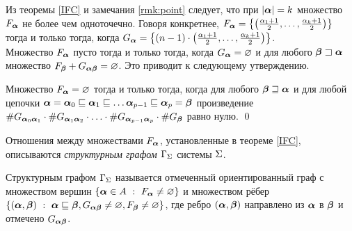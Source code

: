 %
%
%
%
%

Из теоремы \ref{IFC} и замечания \ref{rmk:point} следует, что при $|{\bm{\alpha}}|=k$ множество $F_{\bm{\alpha}}$ не более чем одноточечно.
Говоря конкретнее, $F_{\bm{\alpha}}=\left\{\left(\frac{\alpha_1+1}{2},\ldots, \frac{\alpha_k+1}{2}\right)\right\}$ тогда и только тогда, когда $G_{\bm{\alpha}}=\left\{(n-1)\cdot\left(\frac{\alpha_1+1}{2},\ldots, \frac{\alpha_k+1}{2}\right)\right\}$.\\

Множество $F_{\bm{\alpha}}$ пусто тогда и только тогда, когда $G_{\bm{\alpha}}=\varnothing$ и для любого ${\bm{\beta}}\sqsupset{\bm{\alpha}}$ множество $F_{\bm{\beta}}+G_{{\bm{\alpha}}{\bm{\beta}}}=\varnothing$.
Это приводит к следующему утверждению.

\begin{lemma}
Множество $F_{\bm{\alpha}}=\varnothing$ тогда и только тогда, когда для любого ${\bm{\beta}}\sqsupseteq{\bm{\alpha}}$ и для любой цепочки ${\bm{\alpha}}={\bm{\alpha}}_0\sqsubseteq{\bm{\alpha}}_1\sqsubseteq\ldots {\bm{\alpha}}_{p-1}\sqsubseteq{\bm{\alpha}}_p={\bm{\beta}}$ произведение 
$\#G_{{\bm{\alpha}}_0{\bm{\alpha}}_1}\cdot\#G_{{\bm{\alpha}}_1{\bm{\alpha}}_2}\cdot\ldots\cdot\#G_{{\bm{\alpha}}_{p-1}{\bm{\alpha}}_p}\cdot\#G_{{\bm{\beta}}}$ равно нулю. 
\qed
\end{lemma} 

Отношения между множествами $F_{\bm{\alpha}}$, установленные в теореме \ref{IFC}, описываются {\em структурным графом $\Gamma_\Sigma$} системы $\Sigma$. 

\begin{definition}
Структурным графом $\Gamma_\Sigma$ называется отмеченный ориентированный граф с множеством вершин $\{{\bm{\alpha}}\in A\ :\ F_{\bm{\alpha}}\neq\varnothing\}$ и множеством рёбер $\{({\bm{\alpha}}, {\bm{\beta}})\ :\ {\bm{\alpha}}\sqsubseteq{\bm{\beta}}, G_{{\bm{\alpha}}{\bm{\beta}}}\neq\varnothing, F_{\bm{\beta}}\neq\varnothing\}$, где ребро $({\bm{\alpha}}, {\bm{\beta}})$ направлено из ${\bm{\alpha}}$ в ${\bm{\beta}}$ и отмечено $G_{{\bm{\alpha}}{\bm{\beta}}}$.
\end{definition}

